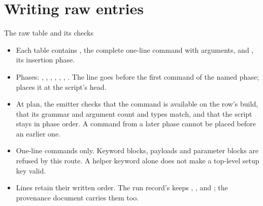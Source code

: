 %
\section{Writing raw entries}

\begin{frame}{The raw table and its checks}
\begin{itemize}\small
  \item Each \code{[[raw]]} table contains , the complete
        one-line command with arguments, and , its insertion phase.
  \item Phases: , , , ,
        , , .
        The line goes before the first command of the named phase;
         places it at the script's head.
  \item At plan, the emitter checks that the command is available on the
        row's build, that its grammar and argument count and types match,
        and that the script stays in phase order. A command from a later
        phase cannot be placed before an earlier one.
  \item One-line commands only. Keyword blocks, payloads and parameter
        blocks are refused by this route. A helper keyword alone does not
        make a top-level setup key valid.
  \item Lines retain their written order. The run record's
         keeps , ,
         and ; the provenance document carries them too.
\end{itemize}
\end{frame}

